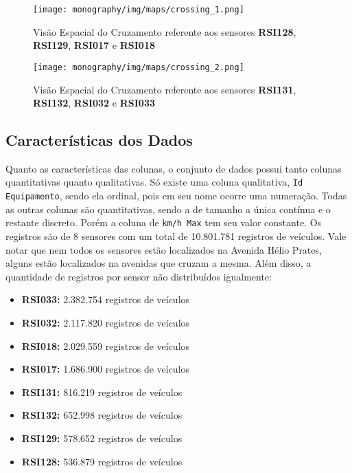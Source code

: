 \begin{figure}[H]
    \begin{minipage}[b]{0.4875\linewidth}
        \centering
        \texttt{[image: monography/img/maps/crossing\_1.png]}
        \label{figure:helio_cruzamento_1}
        \caption[Visão Espacial do Cruzamento referente aos sensores \textbf{RSI128}, \textbf{RSI129}, \textbf{RSI017} e \textbf{RSI018}]{Visão Espacial do Cruzamento referente aos sensores \textbf{RSI128}, \textbf{RSI129}, \textbf{RSI017} e \textbf{RSI018}}
    \end{minipage}
    \hfill
    \begin{minipage}[b]{0.4875\linewidth}
        \centering
        \texttt{[image: monography/img/maps/crossing\_2.png]}
        \label{figure:helio_cruzamento_2}
        \caption[Visão Espacial do Cruzamento referente aos sensores \textbf{RSI131}, \textbf{RSI132}, \textbf{RSI032} e \textbf{RSI033}]{Visão Espacial do Cruzamento referente aos sensores \textbf{RSI131}, \textbf{RSI132}, \textbf{RSI032} e \textbf{RSI033}}
    \end{minipage}
\end{figure}


\subsection{Características dos Dados}

Quanto as características das colunas, o conjunto de dados possui tanto colunas quantitativas quanto qualitativas. Só existe uma coluna qualitativa, \texttt{Id Equipamento}, sendo ela ordinal, pois em seu nome ocorre uma numeração. Todas as outras colunas são quantitativas, sendo a de tamanho a única contínua e o restante discreto. Porém a coluna de \texttt{km/h Max} tem seu valor constante. Os registros são de 8 sensores com um total de 10.801.781 registros de veículos. Vale notar que nem todos os sensores estão localizados na Avenida Hélio Prates, alguns estão localizados na avenidas que cruzam a mesma. Além disso, a quantidade de registros por sensor não distribuídos igualmente:

\begin{itemize}
    \item \textbf{RSI033:} 2.382.754 registros de veículos
    \item \textbf{RSI032:} 2.117.820 registros de veículos
    \item \textbf{RSI018:} 2.029.559 registros de veículos
    \item \textbf{RSI017:} 1.686.900 registros de veículos
    \item \textbf{RSI131:} 816.219 registros de veículos
    \item \textbf{RSI132:} 652.998 registros de veículos
    \item \textbf{RSI129:} 578.652 registros de veículos
    \item \textbf{RSI128:} 536.879 registros de veículos
\end{itemize}

